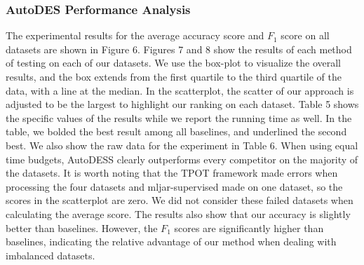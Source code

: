 \documentclass[review]{elsarticle}
\begin{document}
\subsubsection{AutoDES Performance Analysis}
The experimental results for the average accuracy score and $F_1$ score on all datasets are shown in Figure 6. Figures 7 and 8 show the results of each method of testing on each of our datasets. We use the box-plot to visualize the overall results, and the box extends from the first quartile to the third quartile of the data, with a line at the median. In the scatterplot, the scatter of our approach is adjusted to be the largest to highlight our ranking on each dataset. Table 5 shows the specific values of the results while we report the running time as well. In the table, we bolded the best result among all baselines, and underlined the second best. We also show the raw data for the experiment in Table 6.
When using equal time budgets, AutoDESS clearly outperforms every competitor on the majority of the datasets. It is worth noting that the TPOT framework made errors when processing the four datasets and mljar-supervised made on one dataset, so the scores in the scatterplot are zero. We did not consider these failed datasets when calculating the average score. The results also show that our accuracy is slightly better than baselines. However, the $F_1$ scores are significantly higher than baselines, indicating the relative advantage of our method when dealing with imbalanced datasets.
\end{document}
